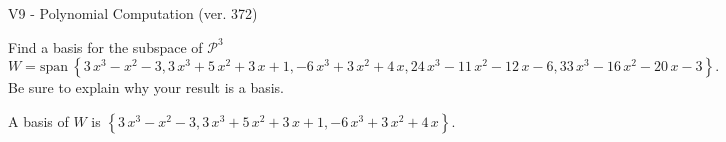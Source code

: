 \begin{exercise}
  \begin{exerciseTitle}V9 - Polynomial Computation (ver. 372)\end{exerciseTitle}
  \begin{exerciseStatement}
    Find a basis for the subspace of \(\mathcal{P}^3\) 
\[W=\mathrm{span}\ \left\{3 \, x^{3} - x^{2} - 3 , 3 \, x^{3} + 5 \, x^{2} + 3 \, x + 1 , -6 \, x^{3} + 3 \, x^{2} + 4 \, x , 24 \, x^{3} - 11 \, x^{2} - 12 \, x - 6 , 33 \, x^{3} - 16 \, x^{2} - 20 \, x - 3\right\}.\]
 Be sure to explain why your result is a basis.


  \end{exerciseStatement}
  \begin{exerciseAnswer}
   A basis of \(W\) is  \(\left\{3 \, x^{3} - x^{2} - 3 , 3 \, x^{3} + 5 \, x^{2} + 3 \, x + 1 , -6 \, x^{3} + 3 \, x^{2} + 4 \, x\right\}\).
  


  \end{exerciseAnswer}
\end{exercise}